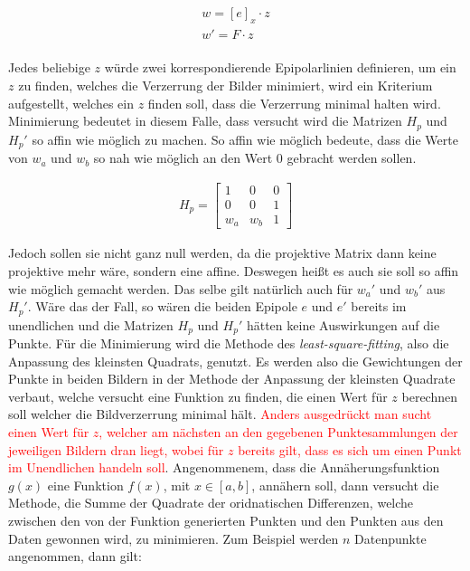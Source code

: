 \begin{gather}
	w = [e]_x \cdot z\\
	w'= F\cdot z
\end{gather}\\

Jedes beliebige $z$ würde zwei korrespondierende Epipolarlinien definieren, um ein $z$ zu finden, welches die Verzerrung der Bilder minimiert, wird ein Kriterium aufgestellt, welches ein $z$ finden soll, dass die Verzerrung minimal halten wird. Minimierung bedeutet in diesem Falle, dass versucht wird die Matrizen $H_p$ und $H_p'$ so affin wie möglich zu machen. So affin wie möglich bedeute, dass die Werte von $w_a$ und $w_b$ so nah wie möglich an den Wert 0 gebracht werden sollen.

\begin{gather}
	H_p = 	\begin{bmatrix}
	1&0&0\\
	0&0&1\\
	w_a&w_b&1
	\end{bmatrix}
\end{gather}

Jedoch sollen sie nicht ganz null werden, da die projektive Matrix dann keine projektive mehr wäre, sondern eine affine.  Deswegen heißt es auch sie soll so affin wie möglich gemacht werden. Das selbe gilt natürlich auch für $w_a'$ und $w_b'$ aus $H_p'$. Wäre das der Fall, so wären die beiden Epipole $e$ und $e'$ bereits im unendlichen und die Matrizen $H_p$ und $H_p'$ hätten keine Auswirkungen auf die Punkte. Für die Minimierung wird die Methode des \textit{least-square-fitting}, also die Anpassung des kleinsten Quadrats, genutzt\cite{leastSquare}. Es werden also die Gewichtungen der Punkte in beiden Bildern in der Methode der Anpassung der kleinsten Quadrate verbaut, welche versucht eine Funktion zu finden, die einen Wert für $z$ berechnen soll welcher die Bildverzerrung minimal hält. \textcolor{red}{Anders ausgedrückt man sucht einen Wert für $z$, welcher am nächsten an den gegebenen Punktesammlungen der jeweiligen Bildern dran liegt, wobei für $z$ bereits gilt, dass es sich um einen Punkt im Unendlichen handeln soll}\cite{ZZ,leastSquare}. Angenommenem, dass die Annäherungsfunktion $g(x)$ eine Funktion $f(x)$, mit $x \in [a,b]$, annähern soll, dann versucht die Methode, die Summe der Quadrate der oridnatischen Differenzen, welche zwischen den von der Funktion generierten Punkten und den Punkten aus den Daten gewonnen wird, zu minimieren\cite{leastSquare,Margulies.}. Zum Beispiel werden $n$ Datenpunkte angenommen, dann gilt:


